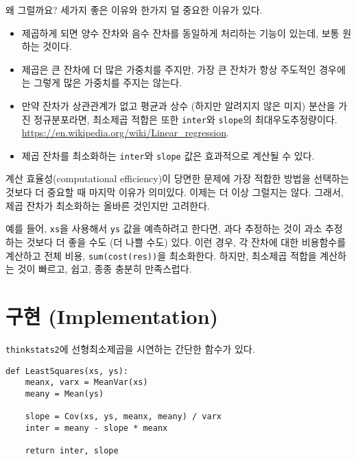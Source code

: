 왜 그럴까요? 세가지 좋은 이유와 한가지 덜 중요한 이유가 있다.

\begin{itemize}

\item 제곱하게 되면 양수 잔차와 음수 잔차를 동일하게 처리하는 기능이 있는데, 보통 원하는 것이다.

\item 제곱은 큰 잔차에 더 많은 가중치를 주지만, 가장 큰 잔차가 항상 주도적인 경우에는 그렇게 많은 가중치를 주지는 않는다.

\item 만약 잔차가 상관관계가 없고 평균과 상수 (하지만 알려지지 않은 미지) 분산을 가진 정규분포라면,
최소제곱 적합은 또한 {\tt inter}와 {\tt slope}의 최대우도추정량이다. \url{https://en.wikipedia.org/wiki/Linear_regression}.  

\item 제곱 잔차를 최소화하는 {\tt inter}와 {\tt slope} 값은 효과적으로 계산될 수 있다.

\end{itemize}

계산 효율성(computational efficiency)이 당면한 문제에 가장 적합한 방법을 선택하는 것보다 더 중요할 때 마지막 이유가 의미있다. 
이제는 더 이상 그럴지는 않다. 그래서, 제곱 잔차가 최소화하는 올바른 것인지만 고려한다.

예를 들어, {\tt xs}을 사용해서 {\tt ys} 값을 예측하려고 한다면,
과다 추정하는 것이 과소 추정하는 것보다 더 좋을 수도 (더 나쁠 수도) 있다.
이런 경우, 각 잔차에 대한 비용함수를 계산하고 전체 비용, {\tt sum(cost(res))}을 최소화한다.
하지만, 최소제곱 적합을 계산하는 것이 빠르고, 쉽고, 종종 충분히 만족스럽다.


\section{구현 (Implementation)}

{\tt thinkstats2}에 선형최소제곱을 시연하는 간단한 함수가 있다.

\begin{verbatim}
def LeastSquares(xs, ys):
    meanx, varx = MeanVar(xs)
    meany = Mean(ys)

    slope = Cov(xs, ys, meanx, meany) / varx
    inter = meany - slope * meanx

    return inter, slope
\end{verbatim}

